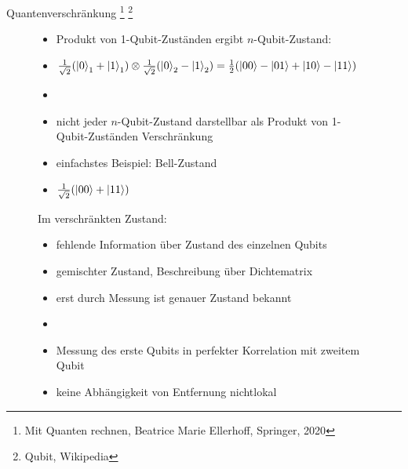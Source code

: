\documentclass[aspectratio=1610, 9pt]{beamer}
\begin{document}
\begin{frame}{Quantenverschränkung \footnote[200]{Mit Quanten rechnen, Beatrice Marie Ellerhoff, Springer, 2020} \footnote[100]{Qubit, Wikipedia} }
  \begin{figure}
    \begin{minipage}{0.49\textwidth}
      \begin{itemize}
        \item Produkt von 1-Qubit-Zuständen ergibt $n$-Qubit-Zustand:
        \item[] $\frac{1}{\sqrt{2}}(\ket{0}_1 + \ket{1}_1) \otimes \frac{1}{\sqrt{2}}(\ket{0}_2 - \ket{1}_2) = \frac{1}{2}(\ket{00}-\ket{01}+\ket{10}-\ket{11} ) $
        \item[]
        \item nicht jeder $n$-Qubit-Zustand darstellbar als Produkt von 1-Qubit-Zuständen \rightarrow Verschränkung
        \item einfachstes Beispiel: Bell-Zustand
        \item[] $\frac{1}{\sqrt{2}}(\ket{00} + \ket{11})$
      \end{itemize}
    \end{minipage}
    \hfill
    \begin{minipage}{0.49\textwidth}
      Im verschränkten Zustand:
      \begin{itemize}
        \item fehlende Information über Zustand des einzelnen Qubits
        \item[\rightarrow] gemischter Zustand, Beschreibung über Dichtematrix
        \item erst durch Messung ist genauer Zustand bekannt
        \item[]
        \item Messung des erste Qubits in perfekter Korrelation mit zweitem Qubit
        \item keine Abhängigkeit von Entfernung \rightarrow nichtlokal
      \end{itemize}
    \end{minipage}
  \end{figure}
\end{frame}
\end{document}
